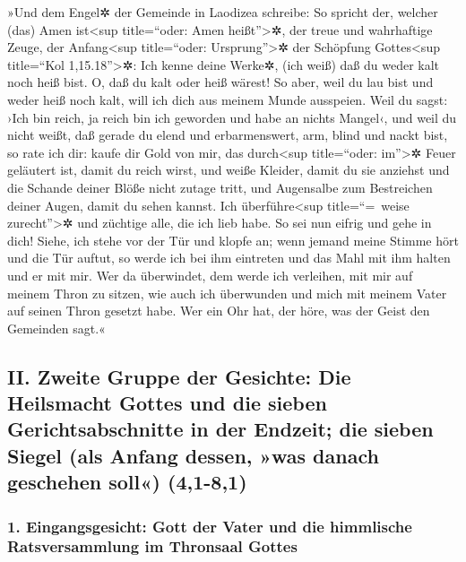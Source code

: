  »Und dem Engel✲ der Gemeinde in Laodizea schreibe: So
spricht der, welcher (das) Amen ist\textless sup title=``oder: Amen
heißt''\textgreater✲, der treue und wahrhaftige Zeuge, der
Anfang\textless sup title=``oder: Ursprung''\textgreater✲ der Schöpfung
Gottes\textless sup title=``Kol 1,15.18''\textgreater✲: 
Ich kenne deine Werke✲, (ich weiß) daß du weder kalt noch heiß bist. O,
daß du kalt oder heiß wärest!  So aber, weil du lau bist
und weder heiß noch kalt, will ich dich aus meinem Munde ausspeien.
 Weil du sagst: ›Ich bin reich, ja reich bin ich geworden
und habe an nichts Mangel‹, und weil du nicht weißt, daß gerade du elend
und erbarmenswert, arm, blind und nackt bist,  so rate
ich dir: kaufe dir Gold von mir, das durch\textless sup title=``oder:
im''\textgreater✲ Feuer geläutert ist, damit du reich wirst, und weiße
Kleider, damit du sie anziehst und die Schande deiner Blöße nicht zutage
tritt, und Augensalbe zum Bestreichen deiner Augen, damit du sehen
kannst.  Ich überführe\textless sup title=``=~weise
zurecht''\textgreater✲ und züchtige alle, die ich lieb habe. So sei nun
eifrig und gehe in dich!  Siehe, ich stehe vor der Tür
und klopfe an; wenn jemand meine Stimme hört und die Tür auftut, so
werde ich bei ihm eintreten und das Mahl mit ihm halten und er mit mir.
 Wer da überwindet, dem werde ich verleihen, mit mir auf
meinem Thron zu sitzen, wie auch ich überwunden und mich mit meinem
Vater auf seinen Thron gesetzt habe.  Wer ein Ohr hat,
der höre, was der Geist den Gemeinden sagt.«

\hypertarget{ii.-zweite-gruppe-der-gesichte-die-heilsmacht-gottes-und-die-sieben-gerichtsabschnitte-in-der-endzeit-die-sieben-siegel-als-anfang-dessen-was-danach-geschehen-soll-41-81}{%
\subsection{II. Zweite Gruppe der Gesichte: Die Heilsmacht Gottes und
die sieben Gerichtsabschnitte in der Endzeit; die sieben Siegel (als
Anfang dessen, »was danach geschehen soll«)
(4,1-8,1)}\label{ii.-zweite-gruppe-der-gesichte-die-heilsmacht-gottes-und-die-sieben-gerichtsabschnitte-in-der-endzeit-die-sieben-siegel-als-anfang-dessen-was-danach-geschehen-soll-41-81}}

\hypertarget{eingangsgesicht-gott-der-vater-und-die-himmlische-ratsversammlung-im-thronsaal-gottes}{%
\subsubsection{1. Eingangsgesicht: Gott der Vater und die himmlische
Ratsversammlung im Thronsaal
Gottes}\label{eingangsgesicht-gott-der-vater-und-die-himmlische-ratsversammlung-im-thronsaal-gottes}}

